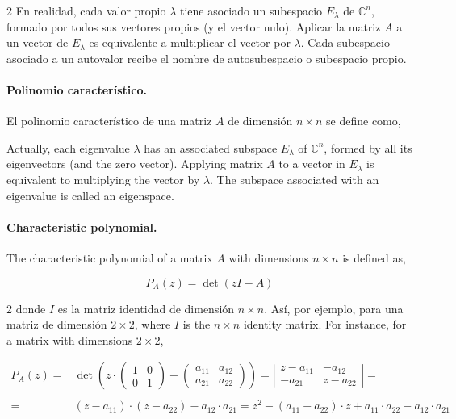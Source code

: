 \begin{paracol}{2}
En realidad, cada valor propio $\lambda$ tiene asociado un subespacio $E_{\lambda}$ de $\mathbb{C}^n$, formado por todos sus vectores propios (y el vector nulo). Aplicar la matriz $A$ a un vector de $E_{\lambda}$ es equivalente a multiplicar el vector por $\lambda$. Cada subespacio asociado a un autovalor recibe el nombre de autosubespacio o subespacio propio.

\paragraph{Polinomio característico.} El polinomio característico de una matriz $A$ de dimensión $n\times n$ se define como,

\switchcolumn
Actually, each eigenvalue $\lambda$ has an associated subspace $E_{\lambda}$ of $\mathbb{C}^n$, formed by all its eigenvectors (and the zero vector). Applying matrix $A$ to a vector in $E_{\lambda}$ is equivalent to multiplying the vector by $\lambda$. The subspace associated with an eigenvalue is called an eigenspace.
\paragraph{Characteristic polynomial.} The characteristic polynomial of a matrix $A$ with dimensions $n\times n$ is defined as, 
\end{paracol}
\begin{equation*}
P_A(z)=\det(zI-A)
\end{equation*}
\begin{paracol}{2}
donde $I$ es la matriz identidad de dimensión $n \times n$. Así, por ejemplo, para una matriz de dimensión $2\times 2$,
\switchcolumn
where $I$ is the $n\times n$ identity matrix. For instance, for a matrix with dimensions $2\times 2$,
\end{paracol}
\begin{align*}
P_A(z)=&\det\left(z\cdot \begin{pmatrix}
1& 0\\
0& 1
\end{pmatrix}- \begin{pmatrix}
a_{11}& a_{12}\\
a_{21}& a_{22}
\end{pmatrix} \right)=\left\vert \begin{matrix}
z-a_{11}& -a_{12}\\
-a_{21}& z-a_{22}
\end{matrix} \right\vert=\\
\\
=&(z-a_{11})\cdot(z-a_{22})-a_{12}\cdot a_{21}=z^2-(a_{11}+a_{22})\cdot z+a_{11}\cdot a_{22}-a_{12}\cdot a_{21}
\end{align*}

